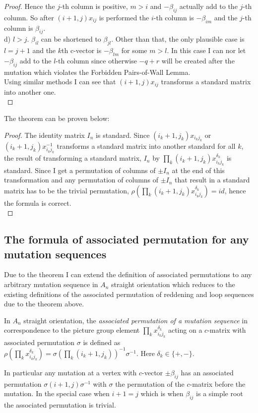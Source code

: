 \begin{proof}
\indent Hence the $j$-th column is positive, $m>i$ and $-\beta_{ij}$ actually add to the $j$-th column. So after $(i+1,j)x_{ij}$ is performed the $i$-th column is $-\beta_{im}$ and the $j$-th column is $\beta_{ij}$.\\
\indent d) $l>j$. $\beta_{il}$ can be shortened to $\beta_{jl}$. Other than that, the only plausible case is $l = j + 1$ and the $k$th c-vector is $-\beta_{lm}$ for some $m>l$. In this case I can nor let $-\beta_{ij}$ add to the $l$-th column since otherwise $-q+r$ will be created after the mutation which violates the Forbidden Pairs-of-Wall Lemma.\\
\indent Using similar methods I can see that $(i+1, j)x_{ij}$ transforms a standard matrix into another one.\\
\end{proof}
\indent The theorem can be proven below:\\
\begin{proof}
The identity matrix $I_n$ is standard. Since $(i_k+1,j_k)x_{i_kj_k}$ or $(i_k+1,j_k)x_{i_kj_k}^{-1}$ transforms a standard matrix into another standard for all $k$, the result of transforming a standard matrix, $I_n$ by $\prod_{k}(i_k+1,j_k)x_{i_kj_k}^{\delta_k}$ is standard. Since I get a permutation of columns of $\pm I_n$ at the end of this transformation and any permutation of columns of $\pm I_n$ that result in a standard matrix has to be the trivial permutation, $\rho(\prod_{k}(i_k+1,j_k)x_{i_kj_k}^{\delta_k})=id$, hence the formula is correct.\\
\end{proof}
\subsection{The formula of associated permutation for any mutation sequences}
\indent Due to the theorem I can extend the definition of associated permutations to any arbitrary mutation sequence in $A_n$ straight orientation which reduces to the existing definitions of the associated permutation of reddening and loop sequences due to the theorem above.
\begin{definition}
In $A_n$ straight orientation, the \textit{associated permutation of a mutation sequence} in correspondence to the picture group element $\prod_{k}x_{i_kj_k}^{\delta_k}$ acting on a $c$-matrix with associated permutation $\sigma$ is defined as $\rho(\prod_{k}x_{i_kj_k}^{\delta_k}) = \sigma(\prod_{k}(i_k+1,j_k))^{-1}\sigma^{-1}$. Here $\delta_k\in\{+,-\}$.\\
\end{definition}
\indent In particular any mutation at a vertex with $c$-vector $\pm\beta_{ij}$ has an associated permutation $\sigma(i+1,j)\sigma^{-1}$ with $\sigma$ the permutation of the $c$-matrix before the mutation. In the special case when $i+1=j$ which is when $\beta_{ij}$ is a simple root the associated permutation is trivial.\\ 